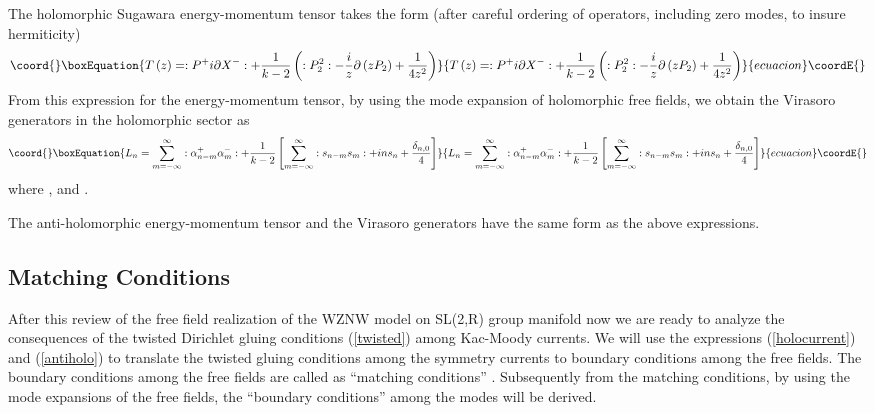 \documentclass[a4paper,12pt]{article}
\begin{document}
The holomorphic Sugawara energy-momentum tensor takes the form (after
careful ordering of operators, including zero modes, to insure hermiticity)
\begin{equation}\coord{}\boxEquation{
T\left( z\right) =:P^{+}i\partial X^{-}:+\frac{1}{k-2}\left( :P_{2}^{2}:-
\frac{i}{z}\partial \left( zP_{2}\right) +\frac{1}{4z^{2}}\right)
\label{T++}
}{
T\left( z\right) =:P^{+}i\partial X^{-}:+\frac{1}{k-2}\left( :P_{2}^{2}:-
\frac{i}{z}\partial \left( zP_{2}\right) +\frac{1}{4z^{2}}\right)
}{ecuacion}\coordE{}\end{equation}
From this expression for the energy-momentum tensor, by using the mode
expansion of holomorphic free fields, we obtain the Virasoro generators in
the holomorphic sector as
\begin{equation}\coord{}\boxEquation{
L_{n}=\sum_{m=-\infty }^{\infty }:\alpha _{n-m}^{+}\alpha _{m}^{-}:+\frac{1}{
k-2}\left[ \sum_{m=-\infty }^{\infty }:s_{n-m}s_{m}:+ins_{n}+\frac{\delta
_{n,0}}{4}\right]  \label{L_n}
}{
L_{n}=\sum_{m=-\infty }^{\infty }:\alpha _{n-m}^{+}\alpha _{m}^{-}:+\frac{1}{
k-2}\left[ \sum_{m=-\infty }^{\infty }:s_{n-m}s_{m}:+ins_{n}+\frac{\delta
_{n,0}}{4}\right]  }{ecuacion}\coordE{}\end{equation}
where \coordHE{}, \coordHE{} and \coordHE{}.

The anti-holomorphic energy-momentum tensor and the Virasoro generators have
the same form as the above expressions.

\subsection{Matching Conditions}

After this review of the free field realization of the WZNW model on SL(2,R)
group manifold now we are ready to analyze the consequences of the twisted
Dirichlet gluing conditions (\ref{twisted}) among Kac-Moody currents. We
will use the expressions (\ref{holocurrent}) and (\ref{antiholo}) to
translate the twisted gluing conditions among the symmetry currents to
boundary conditions among the free fields. The boundary conditions among the
free fields are called as ``matching conditions'' \cite{ishikawa}.
Subsequently from the matching conditions, by using the mode expansions of
the free fields, the ``boundary conditions'' among the modes will be derived.
\end{document}
